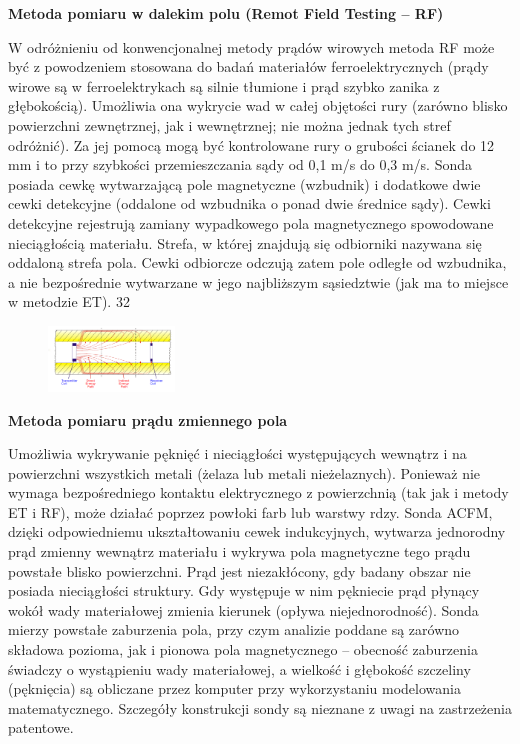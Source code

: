 \documentclass{article}
\begin{document}
\begin{enumerate}
 
 
{\bf  Metoda pomiaru w dalekim polu (Remot Field Testing – RF)}

W odróżnieniu od konwencjonalnej metody prądów wirowych metoda RF może być z powodzeniem stosowana do badań materiałów ferroelektrycznych (prądy wirowe są w ferroelektrykach są silnie tłumione i prąd szybko zanika z głębokością). Umożliwia ona wykrycie wad w całej objętości rury (zarówno blisko powierzchni zewnętrznej, jak i wewnętrznej; nie można jednak tych stref odróżnić). Za jej pomocą mogą być kontrolowane rury o grubości ścianek do 12 mm i to przy szybkości przemieszczania sądy od 0,1 m/s do 0,3 m/s.
Sonda posiada cewkę wytwarzającą pole magnetyczne (wzbudnik) i dodatkowe dwie cewki detekcyjne (oddalone od wzbudnika o ponad dwie średnice sądy). Cewki detekcyjne rejestrują zamiany wypadkowego pola magnetycznego spowodowane nieciągłością materiału. Strefa, w której znajdują się odbiorniki nazywana się oddaloną strefa pola. Cewki odbiorcze odczują zatem pole odległe od wzbudnika, a nie bezpośrednie wytwarzane w jego najbliższym sąsiedztwie (jak ma to miejsce w metodzie ET).
32
 
 
 \begin{figure}[h!]
\centering
\includegraphics[width=0.3\textwidth]{rf}
\end{figure}
 
 
{\bf Metoda pomiaru prądu zmiennego pola}

Umożliwia wykrywanie pęknięć i nieciągłości występujących wewnątrz i na powierzchni wszystkich metali (żelaza lub metali nieżelaznych). Ponieważ nie wymaga bezpośredniego kontaktu elektrycznego z powierzchnią (tak jak i metody ET i RF), może działać poprzez powłoki farb lub warstwy rdzy.
Sonda ACFM, dzięki odpowiedniemu ukształtowaniu cewek indukcyjnych, wytwarza jednorodny prąd zmienny wewnątrz materiału i wykrywa pola magnetyczne tego prądu powstałe blisko powierzchni. Prąd jest niezakłócony, gdy badany obszar nie posiada nieciągłości struktury. Gdy występuje w nim pękniecie prąd płynący wokół wady materiałowej zmienia kierunek (opływa niejednorodność). Sonda mierzy powstałe zaburzenia pola, przy czym analizie poddane są zarówno składowa pozioma, jak i pionowa pola magnetycznego – obecność zaburzenia świadczy o wystąpieniu wady materiałowej, a wielkość i głębokość szczeliny (pęknięcia) są obliczane przez komputer przy wykorzystaniu modelowania matematycznego. Szczegóły konstrukcji sondy są nieznane z uwagi na zastrzeżenia patentowe.
 

\end{enumerate}
\end{document}
